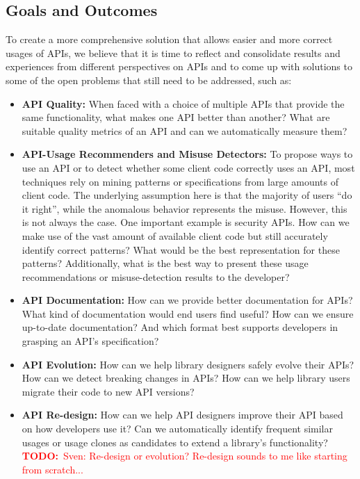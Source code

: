 \documentclass[10pt, conference]{IEEEtran}
\newcommand{\todo}[1]{{\textcolor{red}{\textbf{TODO:}~#1}}}
\begin{document}
\subsection{Goals and Outcomes}
\label{sec:goals}
To create a more comprehensive solution that allows easier and more correct usages of APIs, we believe that it is time to reflect and consolidate results and experiences from different perspectives on APIs and to come up with solutions to some of the open problems that still need to be addressed, such as:

\begin{itemize}
\item \textbf{API Quality:} When faced with a choice of multiple APIs that provide the same functionality, what makes one API better than another? What are suitable quality metrics of an API and can we automatically measure them?

\item \textbf{API-Usage Recommenders and Misuse Detectors:} To propose ways to use an API or to detect whether some client code correctly uses an API, most techniques rely on mining patterns or specifications from large amounts of client code. The underlying assumption here is that the majority of users ``do it right'', while the anomalous behavior represents the misuse. However, this is not always the case. One important example is security APIs. How can we make use of the vast amount of available client code but still accurately identify correct patterns? What would be the best representation for these patterns? Additionally, what is the best way to present these usage recommendations or misuse-detection results to the developer? 

\item\textbf{API Documentation:} How can we provide better documentation for APIs? What kind of documentation would end users find useful? How can we ensure up-to-date documentation? And which format best supports developers in grasping an API's specification?

\item \textbf{API Evolution:} How can we help library designers safely evolve their APIs? How can we detect breaking changes in APIs? How can we help library users migrate their code to new API versions?

\item \textbf{API Re-design:} How can we help API designers improve their API based on how developers use it? Can we automatically identify frequent similar usages or usage clones as candidates to extend a library's functionality?
\todo{Sven: Re-design or evolution? Re-design sounds to me like starting from scratch...}
\end{itemize}
\end{document}
